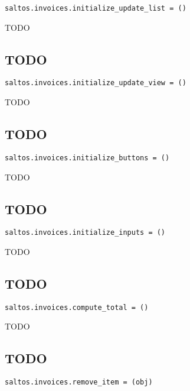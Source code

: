 \documentclass[a4paper]{book}
\begin{document}
\begin{lstlisting}
saltos.invoices.initialize_update_list = ()
\end{lstlisting}

TODO

\hypertarget{toc572}{}
\subsection{TODO}

\begin{lstlisting}
saltos.invoices.initialize_update_view = ()
\end{lstlisting}

TODO

\hypertarget{toc573}{}
\subsection{TODO}

\begin{lstlisting}
saltos.invoices.initialize_buttons = ()
\end{lstlisting}

TODO

\hypertarget{toc574}{}
\subsection{TODO}

\begin{lstlisting}
saltos.invoices.initialize_inputs = ()
\end{lstlisting}

TODO

\hypertarget{toc575}{}
\subsection{TODO}

\begin{lstlisting}
saltos.invoices.compute_total = ()
\end{lstlisting}

TODO

\hypertarget{toc576}{}
\subsection{TODO}

\begin{lstlisting}
saltos.invoices.remove_item = (obj)
\end{lstlisting}
\end{document}
